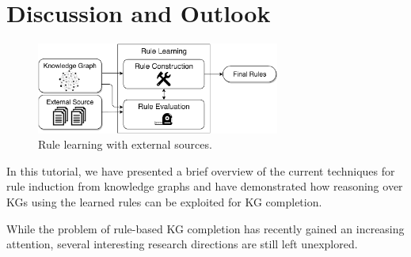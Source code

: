 \section{Discussion and Outlook}\label{sec:disc}

\begin{figure}[t]
\centering
\includegraphics[width=8cm]{figures/discussion_overview}
\caption{Rule learning with external sources.}
\label{fig:discussion_overview}
\end{figure}

In this tutorial, we have presented a brief overview of the current techniques for rule induction from knowledge graphs and have demonstrated how reasoning over KGs using the learned rules  can be exploited for KG completion. %

While the problem of rule-based KG completion has recently gained an increasing attention, several interesting research directions are still left unexplored. %

